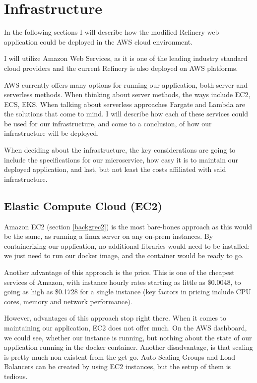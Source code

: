 \section{Infrastructure}
	In the following sections I will describe how the modified Refinery web application could be deployed in the AWS cloud environment.

	I will utilize Amazon Web Services, as it is one of the leading industry standard cloud providers
	and the current Refinery is also deployed on AWS platforms.

	AWS currently offers many options for running our application, both server and serverless methods.
	When thinking about server methods, the ways include EC2, ECS, EKS. When talking about serverless approaches
	Fargate and Lambda are the solutions that come to mind. I will describe how each of these
	services could be used for our infrastructure, and come to a conclusion, of how our infrastructure will be deployed.

	When deciding about the infrastructure, the key considerations are going to include the specifications for our microservice,
	how easy it is to maintain our deployed application, and last, but not least the costs affiliated with said infrastructure.


	\subsection{Elastic Compute Cloud (EC2)}
		Amazon EC2 (section \ref{backgrec2}) is the most bare-bones approach as this
		would be the same, as running a linux server on any on-prem instances. 
		By containerizing our application, no additional libraries
		would need to be installed: we just need to run our docker image, and the container would be ready to go. 
		
		Another advantage of this approach
		is the price. This is one of the cheapest services of Amazon, with instance hourly rates starting as little as \$0.0048, to going as high as 
		\$0.1728 for a single instance (key factors in pricing include CPU cores, memory and network performance).

		However, advantages of this approach stop right there. When it comes to maintaining our application, EC2 does not offer much.
		On the AWS dashboard, we could see, whether our instance is running, but nothing about the state of our application running in 
		the docker container. Another disadvantage, is that scaling is pretty much non-existent from the get-go. Auto Scaling Groups and Load Balancers
		can be created by using EC2 instances, but the setup of them is tedious. 


